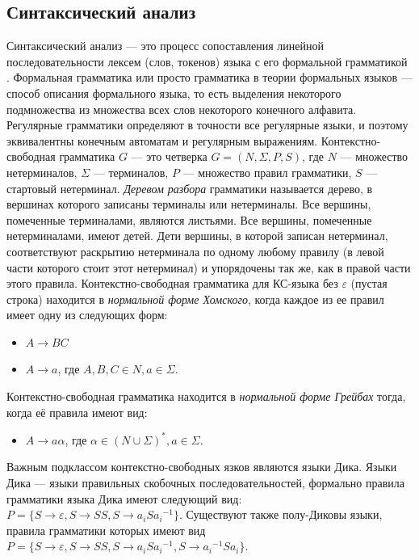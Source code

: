 \subsection{Синтаксический анализ}
Синтаксический анализ --- это процесс сопоставления линейной последовательности лексем (слов, токенов) языка с его формальной грамматикой \cite{UlmanCompilers}.  Формальная грамматика или просто грамматика в теории формальных языков --- способ описания формального языка, то есть выделения некоторого подмножества из множества всех слов некоторого конечного алфавита.  Регулярные грамматики определяют в точности все регулярные языки, и поэтому эквивалентны конечным автоматам и регулярным выражениям. Контекстно-свободная грамматика $G$ --- это четверка $G = (N, \Sigma, P, S)$, где $N$ --- множество нетерминалов, $\Sigma$ --- терминалов, $P$ --- множество правил грамматики, $S$ --- стартовый нетерминал. \textit{Деревом разбора} грамматики называется дерево, в вершинах которого записаны терминалы или нетерминалы. Все вершины, помеченные терминалами, являются листьями. Все вершины, помеченные нетерминалами, имеют детей. Дети вершины, в которой записан нетерминал, соответствуют раскрытию нетерминала по одному любому правилу (в левой части которого стоит этот нетерминал) и упорядочены так же, как в правой части этого правила. Контекстно-свободная грамматика для КС-языка без $\varepsilon$ (пустая строка)  \cite{Hopcroft} находится в \textit{нормальной форме Хомского}, когда каждое из ее правил имеет одну из следующих форм:
\begin{itemize}
\item $A \rightarrow BC$
\item $A \rightarrow a$, где $A, B, C \in N, a \in \Sigma$.
\end{itemize}
Контекстно-свободная грамматика находится в \textit{нормальной форме Грейбах} тогда, когда её правила имеют вид:
\begin{itemize}
\item $A \rightarrow a\alpha$, где $\alpha \in {(N \cup \Sigma)}^*, a \in \Sigma$.
\end{itemize}
Важным подклассом контекстно-свободных язков являются языки Дика. Языки Дика --- языки правильных скобочных последовательностей, формально правила грамматики языка Дика имеют следующий вид: $P = \{S \rightarrow \varepsilon, S \rightarrow SS, S \rightarrow a_i S {a_i}^{-1}\}$. Существуют также полу-Диковы языки, правила грамматики которых имеют вид $P = \{S \rightarrow \varepsilon, S \rightarrow SS, S \rightarrow a_i S {a_i}^{-1}, S \rightarrow {a_i}^{-1} S {a_i}\}$.\par
